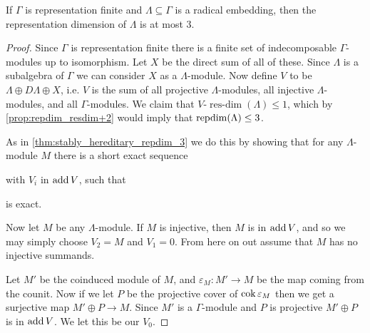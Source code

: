 \begin{theorem}\label{thm:radical_embedding_repdim_3}
	If $\Gamma$ is representation finite and $\Lambda \subseteq \Gamma$ is a radical embedding, then the representation dimension of $\Lambda$ is at most 3.
	\begin{proof}
		Since $\Gamma$ is representation finite there is a finite set of indecomposable $\Gamma$-modules up to isomorphism. Let $X$ be the direct sum of all of these. Since $\Lambda$ is a subalgebra of $\Gamma$ we can consider $X$ as a $\Lambda$-module. Now define $V$ to be $\Lambda \oplus D\Lambda \oplus X$, i.e. $V$ is the sum of all projective $\Lambda$-modules, all injective $\Lambda$-modules, and all $\Gamma$-modules. We claim that $V$-$\operatorname{res-dim}(\Lambda) \leq 1$, which by \cref{prop:repdim_resdim+2} would imply that $\operatorname{repdim}(\Lambda) \leq 3$.
		
		As in \cref{thm:stably_hereditary_repdim_3} we do this by showing that for any  $\Lambda$-module $M$ there is a short exact sequence
		\begin{center}
		\end{center}
		with $V_i$ in $\operatorname{add} V$, such that 
		\begin{center}
		\end{center}
		is exact. 
		
		Now let $M$ be any $\Lambda$-module. If $M$ is injective, then $M$ is in $\operatorname{add} V$, and so we may simply choose $V_2 = M$ and $V_1=0$. From here on out assume that $M$ has no injective summands. 
		
		Let $M'$ be the coinduced module of $M$, and $\varepsilon_M\colon M' \to M$ be the map coming from the counit. Now if we let $P$ be the projective cover of $\operatorname{cok} \varepsilon_M$ then we get a surjective map $M' \oplus P \to M$. Since $M'$ is a $\Gamma$-module and $P$ is projective $M'\oplus P$ is in $\operatorname{add} V$. We let this be our $V_0$.
		

\end{proof}
\end{theorem}
